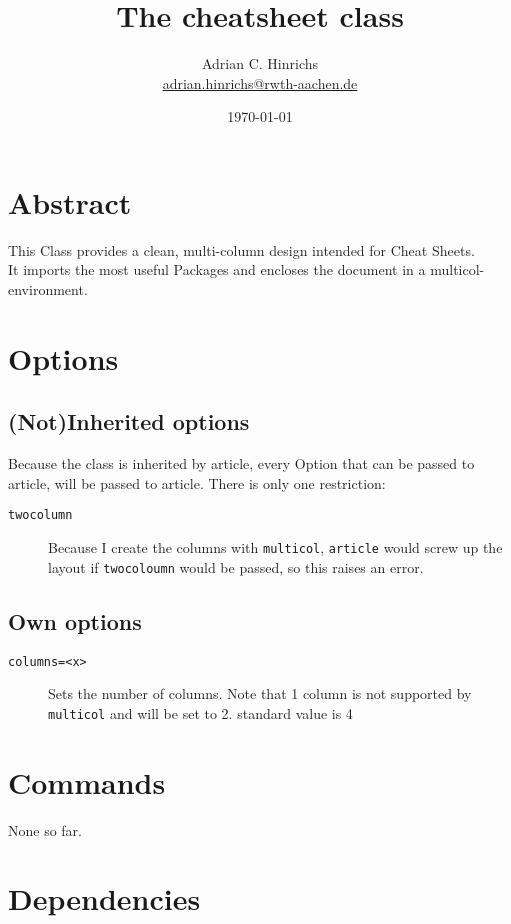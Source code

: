 \documentclass[a4paper,landscape,columns=3]{cheatsheet}
\title{The \textsf{cheatsheet} class\footnotemark}
\author{Adrian
  C. Hinrichs\\
  \href{mailto:adrian.hinrichs@rwth-aachen.de}{adrian.hinrichs@rwth-aachen.de}
}
\date{\today}
\begin{document}
\maketitle
{}
\section{Abstract}
This Class provides a clean, multi-column design intended for Cheat
Sheets.\\

It imports the most useful Packages and encloses the document in a
multicol-environment.
\section{Options}
\subsection{(Not)Inherited options}
Because the class is inherited by article, every Option that can be
passed to article, will be passed to article. There is only one
restriction:
\begin{description}
	\item[\texttt{twocolumn}] Because I create the columns with
		\texttt{multicol}, \texttt{article} would screw up the layout if
		\texttt{twocoloumn} would be passed, so this raises an error.
\end{description}
\subsection{Own options}
\begin{description}
	\item[\texttt{columns=<x>}] Sets the number of columns.  Note that 1
		column is not supported by \lstinline{multicol} and will be set to
		2.  standard value is 4
\end{description}
\section{Commands}
None so far.
\vfill\null\columnbreak
\section{Dependencies}
\end{document}
